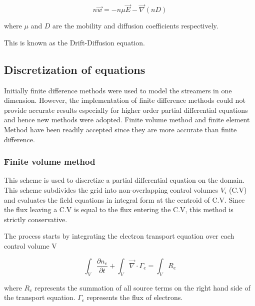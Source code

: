 \documentclass[paper=a4, fontsize=13pt]{scrartcl}
\begin{document}
\begin{equation}
n \vec{w} = - n \mu \vec{E} - \vec{\nabla} (n D)
\end{equation}

where $\mu$ and $D$ are the mobility and diffusion coefficients respectively.


This is known as the Drift-Diffusion equation.



\subsection{Discretization of equations}

Initially finite difference methods were used to model the streamers in one dimension. However, the implementation of finite difference methods could not provide accurate results especially for higher order partial differential equations and hence new methods were adopted. Finite volume method and finite element Method have been readily accepted since they are more accurate than finite difference.

\subsubsection{Finite volume method}

This scheme is used to discretize a partial differential equation on the domain. This scheme subdivides the grid into non-overlapping control volumes $V_i$ (C.V) and evaluates the field equations in integral form at the centroid of C.V. Since the flux leaving a C.V is equal to the flux entering the C.V, this method is strictly conservative.

The process starts by integrating the electron transport equation over each control volume V

\begin{equation}
\int_{V}\frac{\partial n_e}{\partial t} + \int_{V} \vec{\nabla} \cdot \Gamma_e = \int_{V} R_e
\end{equation}


where $R_e$ represents the summation of all source terms on the right hand side of the transport equation. $\Gamma_e$ represents the flux of electrons. 
\end{document}
